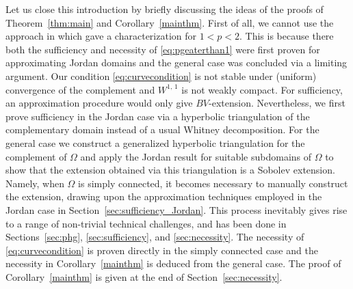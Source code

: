 \documentclass[reqno,11pt]{amsart}
\numberwithin{equation}{section}
\theoremstyle{remark}
\begin{document}
Let us close this introduction by briefly discussing the ideas of the proofs of Theorem~\ref{thm:main} and Corollary~\ref{mainthm}. First of all, we cannot use the approach in \cite{KRZ2015} which gave a characterization for $1<p<2$. This is because there both   the sufficiency and necessity of \eqref{eq:pgeaterthan1} were first proven for approximating Jordan domains and the general case was concluded via a limiting argument. Our condition \eqref{eq:curvecondition} is not stable under (uniform) convergence of the complement and $W^{1,\,1}$ is not weakly compact.  For sufficiency, an approximation procedure would only give $BV$-extension. Nevertheless, we first prove sufficiency in the Jordan case via a hyperbolic triangulation of the complementary domain  instead of a usual Whitney decomposition. For the general case we construct a generalized hyperbolic triangulation for the complement of $\Omega$ and apply the Jordan result for suitable subdomains of $\Omega$ to show that the extension obtained via this triangulation is a Sobolev extension. Namely, when $\Omega$ is simply connected, it becomes necessary to manually construct the extension, drawing upon the approximation techniques employed in the Jordan case in Section~\ref{sec:sufficiency_Jordan}. This process inevitably gives rise to a range of non-trivial technical challenges, and has been done in Sections~\ref{sec:phg}, \ref{sec:sufficiency}, and \ref{sec:necessity}. The necessity of \eqref{eq:curvecondition} is proven directly in the simply connected case and the necessity in Corollary~\ref{mainthm} is deduced from the general case.  The proof of Corollary~\ref{mainthm} is given at the end of Section~\ref{sec:necessity}. 
\end{document}
